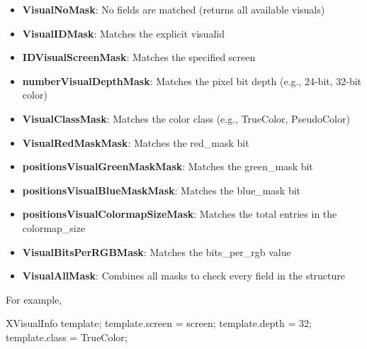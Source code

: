\documentclass{report}
\begin{document}
\begin{itemize}
            \begin{itemize}
                \item \textbf{VisualNoMask}: No fields are matched (returns all available visuals)
                \item \textbf{VisualIDMask}: Matches the explicit visualid 
                \item \textbf{IDVisualScreenMask}: Matches the specified screen 
                \item \textbf{numberVisualDepthMask}: Matches the pixel bit depth (e.g., 24-bit, 32-bit color)
                \item \textbf{VisualClassMask}: Matches the color class (e.g., TrueColor, PseudoColor)
                \item \textbf{VisualRedMaskMask}: Matches the red\_mask bit 
                \item \textbf{positionsVisualGreenMaskMask}: Matches the green\_mask bit 
                \item \textbf{positionsVisualBlueMaskMask}: Matches the blue\_mask bit 
                \item \textbf{positionsVisualColormapSizeMask}: Matches the total entries in the colormap\_size
                \item \textbf{VisualBitsPerRGBMask}: Matches the bits\_per\_rgb value
                \item \textbf{VisualAllMask}: Combines all masks to check every field in the structure
            \end{itemize}
            For example,
            \bigbreak \noindent 
            \begin{cppcode}
                XVisualInfo template;
                template.screen = screen;
                template.depth = 32;
                template.class = TrueColor;


\end{cppcode}
\end{itemize}
\end{document}
